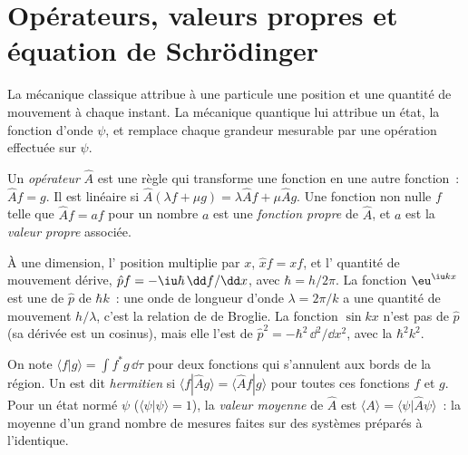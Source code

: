 \section{Opérateurs, valeurs propres et équation de Schrödinger}

La mécanique classique attribue à une particule une position et une
quantité de mouvement à chaque instant. La mécanique quantique lui
attribue un état, la fonction d'onde $\psi$, et remplace chaque grandeur
mesurable par une opération effectuée sur $\psi$.

\begin{definition}\label{def:b3:quantum-model-systems:operator}
Un \emph{opérateur} $\hat A$ est une règle qui
transforme une fonction en une autre fonction~: $\hat A f = g$. Il est
linéaire si $\hat A(\lambda f +
\mu g) = \lambda\hat Af + \mu\hat Ag$. Une fonction non nulle $f$ telle que
$\hat Af = a f$ pour un nombre $a$ est une \emph{fonction propre}
de $\hat A$, et $a$ est la \emph{valeur propre} associée.
\end{definition}

\begin{example}\label{ex:b3:quantum-model-systems:xp}
À une dimension, l' position multiplie par $x$, $\hat x f = xf$,
et l' quantité de mouvement dérive, $\hat p f = -\iu\hbar\,
\dd f/\dd x$, avec $\hbar = h/2\pi$. La fonction $\eu^{\iu kx}$ est une
 de $\hat p$ de  $\hbar k$~: une onde de
longueur d'onde $\lambda = 2\pi/k$ a une quantité de mouvement
$h/\lambda$, c'est la relation de de Broglie. La fonction $\sin kx$ n'est
pas  de $\hat p$ (sa dérivée est un cosinus), mais elle
l'est de $\hat p^2 = -\hbar^2\,\dd^2/\dd x^2$, avec la 
$\hbar^2k^2$.
\end{example}

\begin{definition}\label{def:b3:quantum-model-systems:hermitian}
On note $\langle f|g\rangle = \int f^*g\,\dd\tau$ pour deux fonctions qui
s'annulent aux bords de la région. Un  est dit
\emph{hermitien}
si $\langle f|\hat Ag\rangle = \langle \hat Af|g\rangle$ pour toutes ces
fonctions $f$ et $g$. Pour un état normé $\psi$ ($\langle\psi|\psi\rangle = 1$),
la \emph{valeur moyenne} de $\hat A$ est
$\langle A\rangle = \langle\psi|\hat A\psi\rangle$~: la moyenne d'un grand
nombre de mesures faites sur des systèmes préparés à l'identique.
\end{definition}

